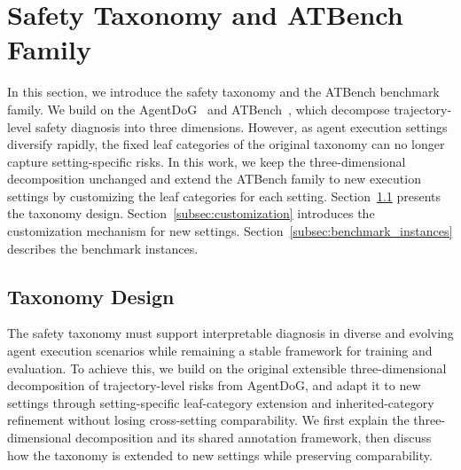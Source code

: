 \documentclass{llmxive}
\begin{document}
\section{Safety Taxonomy and ATBench Family}
\label{sec:safety_taxonmy}
\label{sec:benchmark}


In this section, we introduce the safety taxonomy and the ATBench benchmark family.
We build on the AgentDoG~\citep{liu2026agentdogdiagnosticguardrailframework} and ATBench~\citep{li2026atbench}, which decompose trajectory-level safety diagnosis into three dimensions.
However, as agent execution settings diversify rapidly, the fixed leaf categories of the original taxonomy can no longer capture setting-specific risks. In this work, we keep the three-dimensional decomposition unchanged and extend the ATBench family to new execution settings by customizing the leaf categories for each setting.
Section~\ref{subsec:taxonomy_design} presents the taxonomy design. Section~\ref{subsec:customization} introduces the customization mechanism for new settings. Section~\ref{subsec:benchmark_instances} describes the benchmark instances.


\subsection{Taxonomy Design}
\label{subsec:taxonomy_design}

The safety taxonomy must support interpretable diagnosis in diverse and evolving agent execution scenarios while remaining a stable framework for training and evaluation.
To achieve this, we build on the original extensible three-dimensional decomposition of trajectory-level risks from AgentDoG, and adapt it to new settings through setting-specific leaf-category extension and inherited-category refinement without losing cross-setting comparability.
We first explain the three-dimensional decomposition and its shared annotation framework, then discuss how the taxonomy is extended to new settings while preserving comparability.
\end{document}
